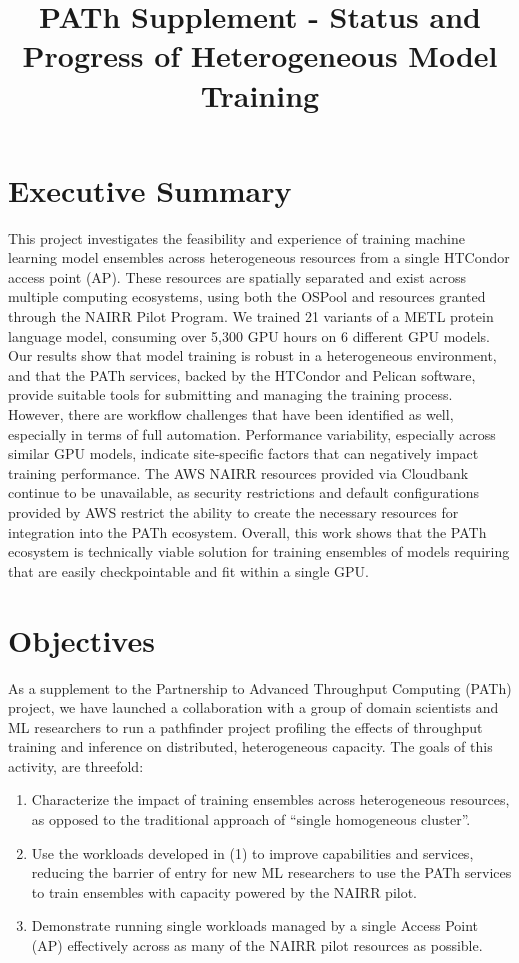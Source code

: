 \documentclass{article}
\title{PATh Supplement - Status and Progress of Heterogeneous Model
  Training}\label{path-supplement---status-and-progress-of-hetergeneous-model-training}
\providecommand{\tightlist}{%
  \setlength{\itemsep}{0pt}\setlength{\parskip}{0pt}}
\begin{document}
\maketitle

\section{Executive Summary}\label{executive-summary}
This project investigates the feasibility and experience of training machine
learning model ensembles across heterogeneous resources from a single HTCondor
access point (AP). These resources are spatially separated and exist across
multiple computing ecosystems, using both the OSPool and resources granted
through the NAIRR Pilot Program. We trained 21 variants of a METL
protein language model, consuming over 5,300 GPU hours on 6 different GPU
models. Our results show that model training is robust in a heterogeneous
environment, and that the PATh services, backed by the HTCondor and Pelican
software, provide suitable tools for submitting and managing the training
process. However, there are workflow challenges that have been identified as
well, especially in terms of full automation. Performance variability,
especially across similar GPU models, indicate site-specific factors that can
negatively impact training performance. The AWS NAIRR resources provided via
Cloudbank continue to be unavailable, as security restrictions and default
configurations provided by AWS restrict the ability to create the necessary
resources for integration into the PATh ecosystem. Overall, this work shows that
the PATh ecosystem is technically viable solution for training ensembles of
models requiring that are easily checkpointable and fit within a single GPU.

\section{Objectives}\label{objectives}

As a supplement to the Partnership to Advanced Throughput Computing
(PATh) project, we have launched a collaboration with a group of
domain scientists and ML researchers to run a pathfinder project
profiling the effects of throughput training and inference on
distributed, heterogeneous capacity. The goals of this activity, are
threefold:

\begin{enumerate}
\tightlist
\item{Characterize the impact of training ensembles across heterogeneous
resources, as opposed to the traditional approach of ``single
homogeneous cluster''.}
\item{Use the workloads developed in (1) to improve capabilities and
services, reducing the barrier of entry for new ML researchers to use
the PATh services to train ensembles with capacity powered by the NAIRR
pilot.}
\item{Demonstrate running single workloads managed by a single Access Point
(AP) effectively across as many of the NAIRR pilot resources as
possible.}
\end{enumerate}
\end{document}

